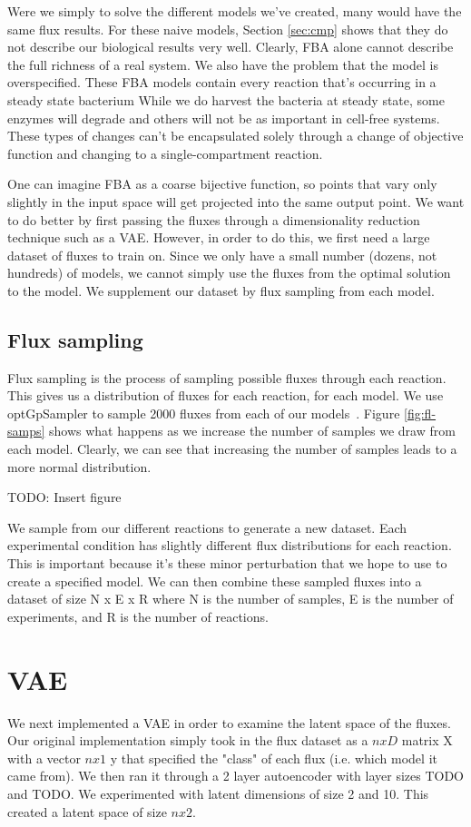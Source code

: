 Were we simply to solve the different models we've created, many would have the same flux results.
For these naive models, Section \ref{sec:cmp} shows that they do not describe our biological results very well.
Clearly, FBA alone cannot describe the full richness of a real system.
We also have the problem that the model is overspecified.
These FBA models contain every reaction that's occurring in a steady state bacterium
While we do harvest the bacteria at steady state, some enzymes will degrade and others will not be as important in cell-free systems.
These types of changes can't be encapsulated solely through a change of objective function and changing to a single-compartment reaction.

One can imagine FBA as a coarse bijective function, so points that vary only slightly in the input space will get projected into the same output point.
We want to do better by first passing the fluxes through a dimensionality reduction technique such as a VAE.
However, in order to do this, we first need a large dataset of fluxes to train on.
Since we only have a small number (dozens, not hundreds) of models, we cannot simply use the fluxes from the optimal solution to the model.
We supplement our dataset by flux sampling from each model.

\subsection{Flux sampling}
Flux sampling is the process of sampling possible fluxes through each reaction.
This gives us a distribution of fluxes for each reaction, for each model.
We use optGpSampler to sample 2000 fluxes from each of our models~\cite{megchelenbrink2014optgpsampler}.
Figure \ref{fig:fl-samps} shows what happens as we increase the number of samples we draw from each model.
Clearly, we can see that increasing the number of samples leads to a more normal distribution.

TODO: Insert figure

We sample from our different reactions to generate a new dataset.
Each experimental condition has slightly different flux distributions for each reaction.
This is important because it's these minor perturbation that we hope to use to create a specified model.
We can then combine these sampled fluxes into a dataset of size N x E x R where N is the number of samples, E is the number of experiments, and R is the number of reactions.

\section{VAE}
We next implemented a VAE in order to examine the latent space of the fluxes.
Our original implementation simply took in the flux dataset as a $n x D$ matrix X with a vector $n x 1$ y that specified the "class" of each flux (i.e. which model it came from).
We then ran it through a 2 layer autoencoder with layer sizes TODO and TODO.
We experimented with latent dimensions of size 2 and 10.
This created a latent space of size $n x 2$.


